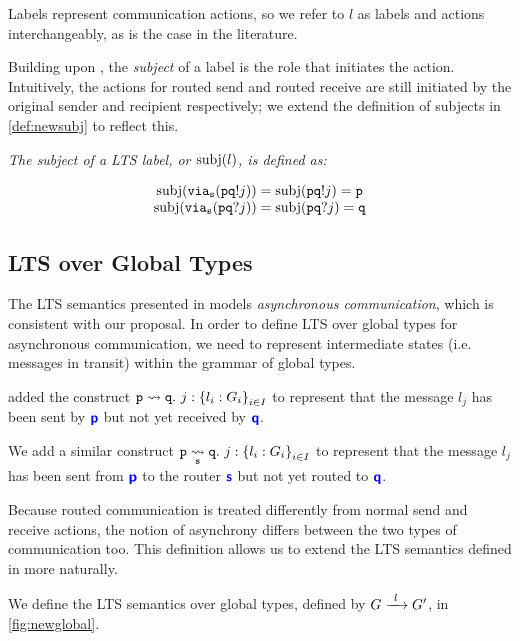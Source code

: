 Labels represent communication actions, so we refer
to $l$ as labels and actions interchangeably,
as is the case in the literature.

Building upon \cite{characterisation},
the \textit{subject} of a label is the role
that initiates the action. 
Intuitively, the actions for routed send and routed
receive are still initiated by the original sender and
recipient respectively;
we extend the definition
of subjects in \cref{def:newsubj} to reflect this.

\begin{definition}[Subject]
\textit{The subject of a LTS label, or $\subj{l}$, is defined as:}

\doublespacing
\[
\begin{array}{c}
\subj{\via{s}{\aout{p}{q}{j}}} = 
	\subj{\aout{p}{q}{j}} = \mrole{p} \\
\subj{\via{s}{\ain{p}{q}{j}}} = 
	\subj{\ain{p}{q}{j}} = \mrole{q} \\
\end{array}
\]
\singlespacing
\label{def:newsubj}
\end{definition}

\subsection{LTS over Global Types}
\label{subsection:newltsglobal}

The LTS semantics presented in \cite{characterisation}
models \textit{asynchronous communication},
which is consistent with our proposal.
In order to define LTS over global types for
asynchronous communication, we need to
represent intermediate states (i.e. messages in transit)
within the grammar of global types.

\cite{characterisation} added the construct
{$\gtrans{p}{q}{j}{l_i: G_i}{i \in I}$}
to represent that the message $l_j$ has been
sent by $\role{p}$ but not yet received by $\role{q}$.

We add a similar construct
{$\gtransroute{p}{q}{s}{j}{l_i: G_i}{i \in I}$}
to represent that the message $l_j$ has
been sent from $\role{p}$ to the router $\role{s}$
but not yet routed to $\role{q}$.

Because routed communication is treated differently
from normal send and receive actions, the notion
of asynchrony differs between the two types of communication
too. This definition allows us to extend
the LTS semantics defined in \cite{characterisation}
more naturally.

We define the LTS semantics 
over global types,
defined by $\treduce{G}{G'}{l}$,
in \cref{fig:newglobal}.

